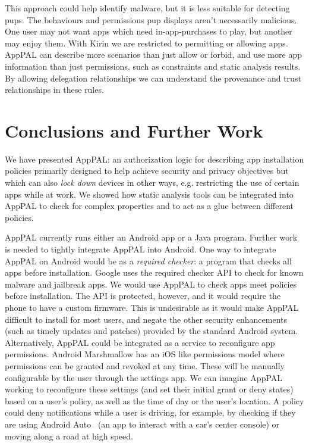 \documentclass[]{llncs}
\begin{document}
This approach could help identify malware, but it is less suitable for detecting \acp{pup}.
The behaviours and permissions \ac{pup} displays aren't necessarily malicious.
One user may not want apps which need in-app-purchases to play, but another may enjoy them.
With Kirin we are restricted to permitting or allowing apps.
AppPAL can describe more scenarios than just allow or forbid, and use more app information than just permissions, such as constraints and static analysis results.
By allowing delegation relationships we can understand the provenance and trust relationships in these rules.

\section{Conclusions and Further Work}

We have presented AppPAL: an authorization logic for describing app installation policies primarily designed to help achieve security and privacy objectives but which can also \emph{lock down} devices in other ways, e.g. restricting the use of certain apps while at work.
We showed how static analysis tools can be integrated into AppPAL to check for complex properties and to act as a glue between different policies.

AppPAL currently runs either an Android app or a Java program.
Further work is needed to tightly integrate AppPAL into Android.
One way to integrate AppPAL on Android would be as a \emph{required checker}: a program that checks all apps before installation.
Google uses the required checker API to check for known malware and jailbreak apps.
We would use AppPAL to check apps meet policies before installation.
The API is protected, however, and it would require the phone to have a custom firmware.
This is undesirable as it would make AppPAL difficult to install for most users, and negate the other security enhancements (such as timely updates and patches) provided by the standard Android system.
Alternatively, AppPAL could be integrated as a service to reconfigure app permissions.
Android Marshmallow has an iOS like permissions model where permissions can be granted and revoked at any time.
These will be manually configurable by the user through the settings app.
We can imagine AppPAL working to reconfigure these settings (and set their initial grant or deny states) based on a user's policy, as well as the time of day or the user's location.
A policy could deny notifications while a user is driving, for example, by checking if they are using Android Auto~\cite{AndroidAuto:uw} (an app to interact with a car's center console) or moving along a road at high speed.
\end{document}
